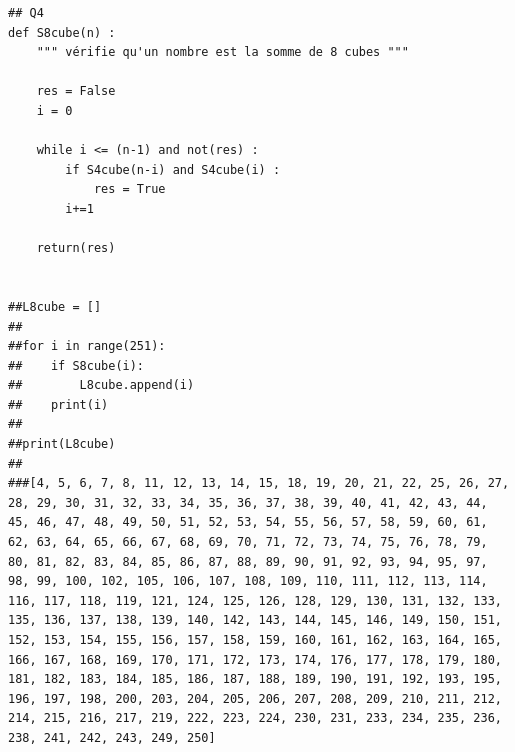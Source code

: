 \documentclass[10pt,fleqn]{article} %
\begin{document}
\begin{corrige}
\begin{lstlisting}
## Q4
def S8cube(n) :
    """ vérifie qu'un nombre est la somme de 8 cubes """
    
    res = False
    i = 0
    
    while i <= (n-1) and not(res) :
        if S4cube(n-i) and S4cube(i) :
            res = True
        i+=1
        
    return(res)


##L8cube = []
##
##for i in range(251):
##    if S8cube(i):
##        L8cube.append(i)
##    print(i)
##
##print(L8cube)
##
###[4, 5, 6, 7, 8, 11, 12, 13, 14, 15, 18, 19, 20, 21, 22, 25, 26, 27, 28, 29, 30, 31, 32, 33, 34, 35, 36, 37, 38, 39, 40, 41, 42, 43, 44, 45, 46, 47, 48, 49, 50, 51, 52, 53, 54, 55, 56, 57, 58, 59, 60, 61, 62, 63, 64, 65, 66, 67, 68, 69, 70, 71, 72, 73, 74, 75, 76, 78, 79, 80, 81, 82, 83, 84, 85, 86, 87, 88, 89, 90, 91, 92, 93, 94, 95, 97, 98, 99, 100, 102, 105, 106, 107, 108, 109, 110, 111, 112, 113, 114, 116, 117, 118, 119, 121, 124, 125, 126, 128, 129, 130, 131, 132, 133, 135, 136, 137, 138, 139, 140, 142, 143, 144, 145, 146, 149, 150, 151, 152, 153, 154, 155, 156, 157, 158, 159, 160, 161, 162, 163, 164, 165, 166, 167, 168, 169, 170, 171, 172, 173, 174, 176, 177, 178, 179, 180, 181, 182, 183, 184, 185, 186, 187, 188, 189, 190, 191, 192, 193, 195, 196, 197, 198, 200, 203, 204, 205, 206, 207, 208, 209, 210, 211, 212, 214, 215, 216, 217, 219, 222, 223, 224, 230, 231, 233, 234, 235, 236, 238, 241, 242, 243, 249, 250]

\end{lstlisting}
\end{corrige}
\end{document}
